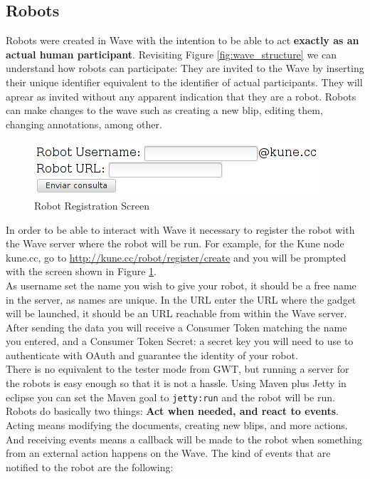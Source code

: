 \subsection{Robots}
Robots were created in Wave with the intention to be able to act \textbf{exactly as an actual human participant}. Revisiting Figure \ref{fig:wave_structure} we can understand how robots can participate: They are invited to the Wave by inserting their unique identifier equivalent to the identifier of actual participants. They will aprear as invited without any apparent indication that they are a robot. Robots can make changes to the wave such as creating a new blip, editing them, changing annotations, among other.\\[.2cm]
\begin{figure}[h]
  \center
    \includegraphics[keepaspectratio, scale=0.6]{Media/Captures/Wave/RegisterRobot.png}
  \caption{Robot Registration Screen}
  \label{fig:robot_register}
\end{figure}
In order to be able to interact with Wave it necessary to register the robot with the Wave server where the robot will be run. For example, for the Kune node kune.cc, go to \url{http://kune.cc/robot/register/create} and you will be prompted with the screen shown in Figure \ref{fig:robot_register}.\\[.2cm]
As username set the name you wish to give your robot, it should be a free name in the server, as names are unique. In the URL enter the URL where the gadget will be launched, it should be an URL reachable from within the Wave server. After sending the data you will receive a Consumer Token matching the name you entered, and a Consumer Token Secret: a secret key you will need to use to authenticate with OAuth and guarantee the identity of your robot.\\[.2cm]
There is no equivalent to the tester mode from GWT, but running a server for the robots is easy enough so that it is not a hassle. Using Maven plus Jetty in eclipse you can set the Maven goal to \verb|jetty:run| and the robot will be run.\\[.2cm]
Robots do basically two things: \textbf{Act when needed, and react to events}. Acting means modifying the documents, creating new blips, and more actions. And receiving events means a callback will be made to the robot when something from an external action happens on the Wave. The kind of events that are notified to the robot are the following:
